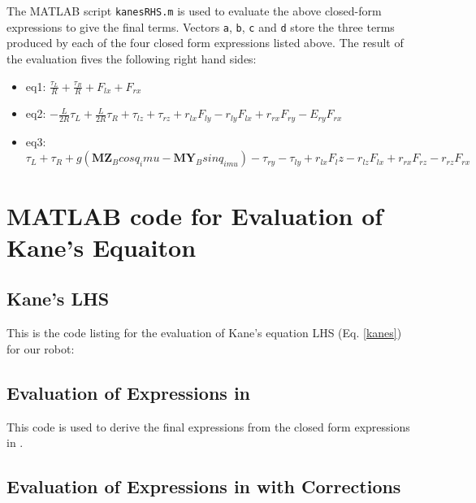 \documentclass[a4paper,10pt]{article}
\begin{document}
The MATLAB script \texttt{kanesRHS.m} is used to evaluate the above closed-form expressions to give the final terms.
Vectors \texttt{a}, \texttt{b}, \texttt{c} and \texttt{d} store the three terms produced by each of the four closed form expressions listed
above. The result of the evaluation fives the following right hand sides:
\begin{itemize}[label={}]
 \item{eq1:} $\frac{\tau_L}{R} + \frac{\tau_R}{R} + F_{lx} + F_{rx}$
 \item{eq2:} $-\frac{L}{2R}\tau_L + \frac{L}{2R}\tau_R + \tau_{lz} + \tau_{rz} + r_{lx}F_{ly} - r_{ly}F_{lx} + r_{rx}F_{ry} - E_{ry}F_{rx}$
 \item{eq3:} $\tau_L + \tau_R + g\left(\mathbf{MZ}_Bcosq_imu - \mathbf{MY}_Bsinq_{imu}\right) - \tau_{ry} - \tau_{ly} + r_{lx}F_lz - r_{lz}F_{lx} + r_{rx}F_{rz} - r_{rz}F_{rx}$
\end{itemize}

\appendix

\section{MATLAB code for Evaluation of Kane's Equaiton}

\subsection{Kane's LHS} \label{app1}

This is the code listing for the evaluation of Kane's equation LHS (Eq. \ref{kanes}) for our robot:




\subsection{Evaluation of Expressions in \cite{kim2005dynamic}} \label{app2}

This code is used to derive the final expressions from the closed form expressions in \cite{kim2005dynamic}.



\subsection{Evaluation of Expressions in \cite{kim2005dynamic} with Corrections} \label{app3}
\end{document}
